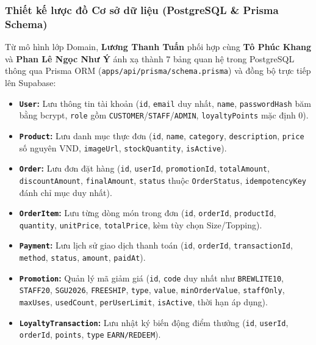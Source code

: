 \subsubsection{Thiết kế lược đồ Cơ sở dữ liệu (PostgreSQL \& Prisma Schema)}
Từ mô hình lớp Domain, \textbf{Lương Thanh Tuấn} phối hợp cùng \textbf{Tô Phúc Khang} và \textbf{Phan Lê Ngọc Như Ý} ánh xạ thành 7 bảng quan hệ trong PostgreSQL thông qua Prisma ORM (\texttt{apps/api/prisma/schema.prisma}) và đồng bộ trực tiếp lên Supabase:
\begin{itemize}
    \item \textbf{\texttt{User}:} Lưu thông tin tài khoản (\texttt{id}, \texttt{email} duy nhất, \texttt{name}, \texttt{passwordHash} băm bằng bcrypt, \texttt{role} gồm \texttt{CUSTOMER}/\texttt{STAFF}/\texttt{ADMIN}, \texttt{loyaltyPoints} mặc định 0).
    \item \textbf{\texttt{Product}:} Lưu danh mục thực đơn (\texttt{id}, \texttt{name}, \texttt{category}, \texttt{description}, \texttt{price} số nguyên VND, \texttt{imageUrl}, \texttt{stockQuantity}, \texttt{isActive}).
    \item \textbf{\texttt{Order}:} Lưu đơn đặt hàng (\texttt{id}, \texttt{userId}, \texttt{promotionId}, \texttt{totalAmount}, \texttt{discountAmount}, \texttt{finalAmount}, \texttt{status} thuộc \texttt{OrderStatus}, \texttt{idempotencyKey} đánh chỉ mục duy nhất).
    \item \textbf{\texttt{OrderItem}:} Lưu từng dòng món trong đơn (\texttt{id}, \texttt{orderId}, \texttt{productId}, \texttt{quantity}, \texttt{unitPrice}, \texttt{totalPrice}, kèm tùy chọn Size/Topping).
    \item \textbf{\texttt{Payment}:} Lưu lịch sử giao dịch thanh toán (\texttt{id}, \texttt{orderId}, \texttt{transactionId}, \texttt{method}, \texttt{status}, \texttt{amount}, \texttt{paidAt}).
    \item \textbf{\texttt{Promotion}:} Quản lý mã giảm giá (\texttt{id}, \texttt{code} duy nhất như \texttt{BREWLITE10}, \texttt{STAFF20}, \texttt{SGU2026}, \texttt{FREESHIP}, \texttt{type}, \texttt{value}, \texttt{minOrderValue}, \texttt{staffOnly}, \texttt{maxUses}, \texttt{usedCount}, \texttt{perUserLimit}, \texttt{isActive}, thời hạn áp dụng).
    \item \textbf{\texttt{LoyaltyTransaction}:} Lưu nhật ký biến động điểm thưởng (\texttt{id}, \texttt{userId}, \texttt{orderId}, \texttt{points}, \texttt{type} \texttt{EARN/REDEEM}).
\end{itemize}